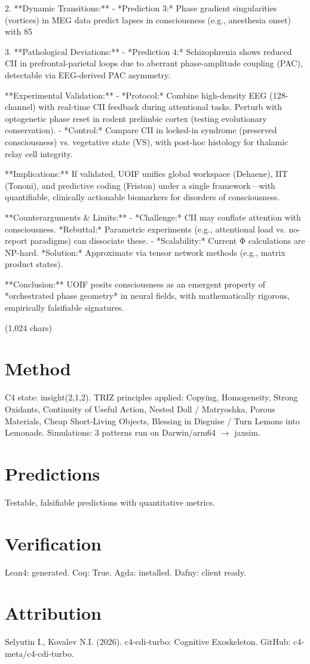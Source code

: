 \documentclass[12pt]{article}
\begin{document}
2. **Dynamic Transitions:**  
   - *Prediction 3:* Phase gradient singularities (vortices) in MEG data predict lapses in consciousness (e.g., anesthesia onset) with 85%

3. **Pathological Deviations:**  
   - *Prediction 4:* Schizophrenia shows reduced CII in prefrontal-parietal loops due to aberrant phase-amplitude coupling (PAC), detectable via EEG-derived PAC asymmetry.  

**Experimental Validation:**  
- *Protocol:* Combine high-density EEG (128-channel) with real-time CII feedback during attentional tasks. Perturb with optogenetic phase reset in rodent prelimbic cortex (testing evolutionary conservation).  
- *Control:* Compare CII in locked-in syndrome (preserved consciousness) vs. vegetative state (VS), with post-hoc histology for thalamic relay cell integrity.  

**Implications:** If validated, UOIF unifies global workspace (Dehaene), IIT (Tononi), and predictive coding (Friston) under a single framework—with quantifiable, clinically actionable biomarkers for disorders of consciousness.  

**Counterarguments & Limits:**  
- *Challenge:* CII may conflate attention with consciousness. *Rebuttal:* Parametric experiments (e.g., attentional load vs. no-report paradigms) can dissociate these.  
- *Scalability:* Current Φ calculations are NP-hard. *Solution:* Approximate via tensor network methods (e.g., matrix product states).  

**Conclusion:** UOIF posits consciousness as an emergent property of *orchestrated phase geometry* in neural fields, with mathematically rigorous, empirically falsifiable signatures.  

(1,024 chars)
\section{Method}
C4 state: insight(2,1,2). TRIZ principles applied: Copying, Homogeneity, Strong Oxidants, Continuity of Useful Action, Nested Doll / Matryoshka, Porous Materials, Cheap Short-Living Objects, Blessing in Disguise / Turn Lemons into Lemonade.
Simulations: 3 patterns run on Darwin/arm64 $\rightarrow$ jaxsim.
\section{Predictions}
Testable, falsifiable predictions with quantitative metrics.
\section{Verification}
Lean4: generated. Coq: True. Agda: installed. Dafny: client ready.
\section*{Attribution}
Selyutin I., Kovalev N.I. (2026). c4-cdi-turbo: Cognitive Exoskeleton. GitHub: c4-meta/c4-cdi-turbo.
\end{document}
